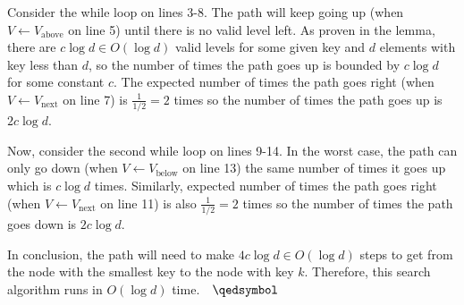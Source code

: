 Consider the while loop on lines 3-8. The path will keep going up (when $V\gets V_\text{above}$ on line 5) until there is no valid level left.
As proven in the lemma, there are $c\log d \in O(\log d)$ valid levels for some given key and $d$ elements with key less than $d$, so the number of times the path goes up is bounded by $c\log d$ for some constant $c$.
The expected number of times the path goes right (when $V \gets V_\text{next}$ on line 7) is $\frac{1}{1/2} = 2$ times so the number of times the path goes up is $2c\log d$.

Now, consider the second while loop on lines 9-14. In the worst case, the path can only go down (when $V \gets V_\text{below}$ on line 13) the same number of times it goes up which is $c\log d$ times.
Similarly, expected number of times the path goes right (when $V \gets V_\text{next}$ on line 11) is also $\frac{1}{1/2} = 2$ times so the number of times the path goes down is $2c\log d$.

In conclusion, the path will need to make $4c\log d \in O(\log d)$ steps to get from the node with the smallest key to the node with key $k$. Therefore, this search algorithm runs in $O(\log d)$ time.$\quad\qedsymbol$
